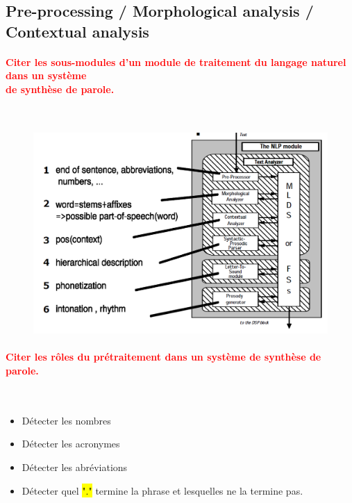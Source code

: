 \documentclass[letterpaper, 12pt]{article}
\newcommand{\red}[1]{
	\textcolor{red}{#1}
}
\begin{document}
    \subsection{Pre-processing / Morphological analysis / Contextual analysis}
    	\paragraph{\red{Citer les sous-modules d'un module de traitement du langage naturel dans un système 
    	~\\ \hspace*{0.035cm} de synthèse de parole.}}~\\
			\begin{figure}[H]
				\centering
				\includegraphics[scale=0.45]{Images/phonetics}
			\end{figure}\noindent
		\vspace*{-0.75cm}
		\paragraph{\red{Citer les rôles du prétraitement dans un système de synthèse de parole.}}~\\
			\begin{itemize}
				\setlength{\itemsep}{0pt}		
				\setlength{\parskip}{0pt}		
				\setlength{\parsep}{0pt}	
				\item Détecter les nombres
				\item Détecter les acronymes
				\item Détecter les abréviations
				\item Détecter quel \hl{"."} termine la phrase et lesquelles ne la termine pas.
			\end{itemize}
\end{document}
